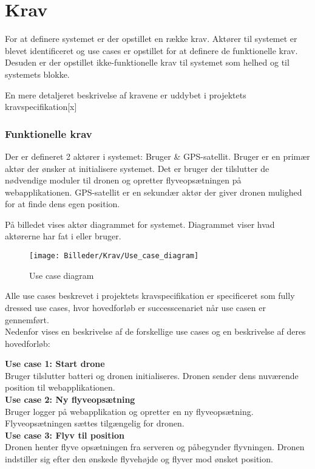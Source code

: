 \chapter{Krav}

For at definere systemet er der opstillet en række krav. Aktører til systemet er blevet identificeret og use cases er opstillet for at definere de funktionelle krav. Desuden er der opstillet ikke-funktionelle krav til systemet som helhed og til systemets blokke.\newline

En mere detaljeret beskrivelse af kravene er uddybet i projektets kravspecifikation[x]

\subsection{Funktionelle krav}
Der er defineret 2 aktører i systemet: Bruger \& GPS-satellit.
Bruger er en primær aktør der ønsker at initialisere systemet. Det er bruger der tilslutter de nødvendige moduler til dronen og opretter flyveopsætningen på webapplikationen.
GPS-satellit er en sekundær aktør der giver dronen mulighed for at finde dens egen position. 

På billedet vises aktør diagrammet for systemet. Diagrammet viser hvad aktørerne har fat i eller bruger.
\begin{figure}[H]
	\centering
	\texttt{[image: Billeder/Krav/Use\_case\_diagram]}
	\caption{Use case diagram}
	\label{fig:useCaseDiagram}
\end{figure}

Alle use cases beskrevet i projektets kravspecifikation er specificeret som fully dressed use cases, hvor hovedforløb er successcenariet når use casen er gennemført. \\
Nedenfor vises en beskrivelse af de forskellige use cases og en beskrivelse af deres hovedforløb:

\textbf{Use case 1: Start drone} \\
Bruger tilslutter batteri og dronen initialiseres. Dronen sender dens nuværende position til webapplikationen.\\

\textbf{Use case 2: Ny flyveopsætning} \\
Bruger logger på webapplikation og opretter en ny flyveopsætning. Flyveopsætningen sættes tilgængelig for dronen.\\

\textbf{Use case 3: Flyv til position}\\
Dronen henter flyve opsætningen fra serveren og påbegynder flyvningen. Dronen indstiller sig efter den ønskede flyvehøjde og flyver mod ønsket position. \\

